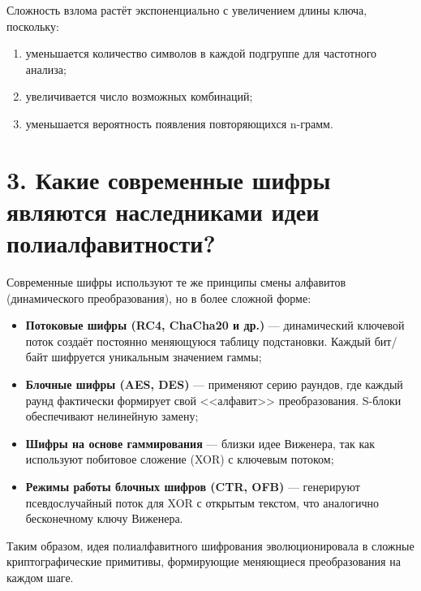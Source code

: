 Сложность взлома растёт экспоненциально с увеличением длины ключа, поскольку:
\begin{enumerate}
    \item уменьшается количество символов в каждой подгруппе для частотного анализа;
    \item увеличивается число возможных комбинаций;
    \item уменьшается вероятность появления повторяющихся n-грамм.
\end{enumerate}

\section*{3. Какие современные шифры являются наследниками идеи полиалфавитности?}

Современные шифры используют те же принципы смены алфавитов (динамического преобразования), но в более сложной форме:

\begin{itemize}
    \item \textbf{Потоковые шифры (RC4, ChaCha20 и др.)} --- динамический ключевой поток создаёт постоянно меняющуюся таблицу подстановки. Каждый бит/байт шифруется уникальным значением гаммы;

    \item \textbf{Блочные шифры (AES, DES)} --- применяют серию раундов, где каждый раунд фактически формирует свой <<алфавит>> преобразования. S-блоки обеспечивают нелинейную замену;

    \item \textbf{Шифры на основе гаммирования} --- близки идее Виженера, так как используют побитовое сложение (XOR) с ключевым потоком;

    \item \textbf{Режимы работы блочных шифров (CTR, OFB)} --- генерируют псевдослучайный поток для XOR с открытым текстом, что аналогично бесконечному ключу Виженера.
\end{itemize}

Таким образом, идея полиалфавитного шифрования эволюционировала в сложные криптографические примитивы, формирующие меняющиеся преобразования на каждом шаге.
